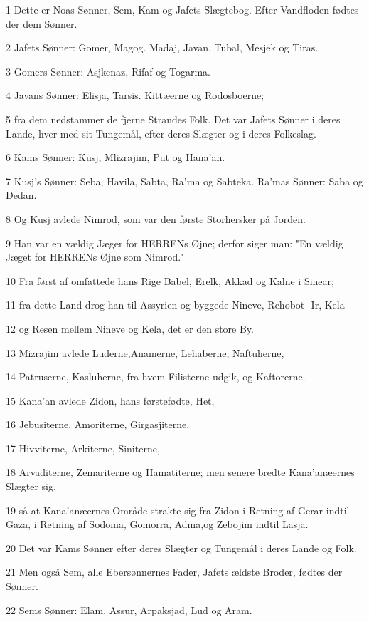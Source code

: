 \par 1 Dette er Noas Sønner, Sem, Kam og Jafets Slægtebog. Efter Vandfloden fødtes der dem Sønner.
\par 2 Jafets Sønner: Gomer, Magog. Madaj, Javan, Tubal, Mesjek og Tiras.
\par 3 Gomers Sønner: Asjkenaz, Rifaf og Togarma.
\par 4 Javans Sønner: Elisja, Tarsis. Kittæerne og Rodosboerne;
\par 5 fra dem nedstammer de fjerne Strandes Folk. Det var Jafets Sønner i deres Lande, hver med sit Tungemål, efter deres Slægter og i deres Folkeslag.
\par 6 Kams Sønner: Kusj, Mlizrajim, Put og Hana'an.
\par 7 Kusj's Sønner: Seba, Havila, Sabta, Ra'ma og Sabteka. Ra'mas Sønner: Saba og Dedan.
\par 8 Og Kusj avlede Nimrod, som var den første Storhersker på Jorden.
\par 9 Han var en vældig Jæger for HERRENs Øjne; derfor siger man: "En vældig Jæget for HERRENs Øjne som Nimrod."
\par 10 Fra først af omfattede hans Rige Babel, Erelk, Akkad og Kalne i Sinear;
\par 11 fra dette Land drog han til Assyrien og byggede Nineve, Rehobot- Ir, Kela
\par 12 og Resen mellem Nineve og Kela, det er den store By.
\par 13 Mizrajim avlede Luderne,Anamerne, Lehaberne, Naftuherne,
\par 14 Patruserne, Kasluherne, fra hvem Filisterne udgik, og Kaftorerne.
\par 15 Kana'an avlede Zidon, hans førstefødte, Het,
\par 16 Jebusiterne, Amoriterne, Girgasjiterne,
\par 17 Hivviterne, Arkiterne, Siniterne,
\par 18 Arvaditerne, Zemariterne og Hamatiterne; men senere bredte Kana'anæernes Slægter sig,
\par 19 så at Kana'anæernes Område strakte sig fra Zidon i Retning af Gerar indtil Gaza, i Retning af Sodoma, Gomorra, Adma,og Zebojim indtil Lasja.
\par 20 Det var Kams Sønner efter deres Slægter og Tungemål i deres Lande og Folk.
\par 21 Men også Sem, alle Ebersønnernes Fader, Jafets ældste Broder, fødtes der Sønner.
\par 22 Sems Sønner: Elam, Assur, Arpaksjad, Lud og Aram.
